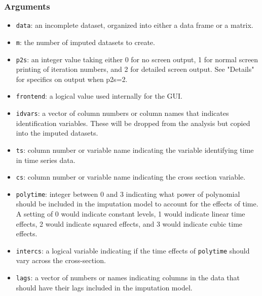 \documentclass[12pt,titlepage]{article}
\begin{document}
\subsubsection*{Arguments}
    \begin{itemize}

  \item \texttt{data}: an incomplete dataset, organized into either a data frame 
    or a matrix.
  
  \item \texttt{m}: the number of imputed datasets to create.
  
  \item \texttt{p2s}:  an integer value taking either 0 for no screen output, 1 for normal screen printing of iteration numbers, and 2 for detailed screen output.  See "Details" for specifics on output when p2s=2.

  \item \texttt{frontend}: a logical value used internally for the GUI.
  
  \item \texttt{idvars}:  a vector of column numbers or column names that indicates identification variables.  These will be dropped from the analysis but copied into the imputed datasets.
    
  \item \texttt{ts}:  column number or variable name indicating the variable identifying time in time series data.
  
  \item \texttt{cs}: column number or variable name indicating the cross section variable.
  
  \item  \texttt{polytime}:  integer between 0 and 3 indicating what
        power of polynomial should be included in the imputation model
        to account for the effects of time.  A setting of 0 would
        indicate constant levels, 1 would indicate linear time
        effects, 2 would indicate squared effects, and 3 would
        indicate cubic time effects.

  \item \texttt{intercs}: a logical variable indicating if the
        time effects of \texttt{polytime} should vary across the
        cross-section.
  
  \item \texttt{lags}:  a vector of numbers or names indicating columns in the data that should have their lags included in the imputation model.
  

\end{itemize}
\end{document}
